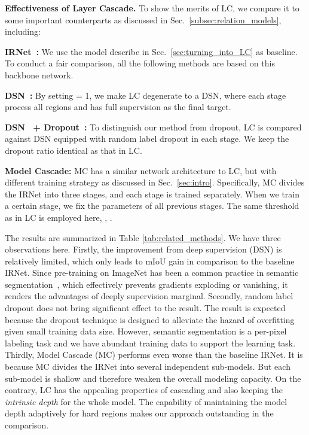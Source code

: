 \documentclass[10pt,twocolumn,letterpaper]{article}
\begin{document}
\vspace{0.1cm}
\noindent
\textbf{Effectiveness of Layer Cascade.}
To show the merits of LC, we compare it to some important counterparts as discussed in Sec.~\ref{subsec:relation_models}, including:
\begin{itemize}
\small{
    \item \textbf{IRNet~\cite{szegedy2016inception}:}
We use the model describe in Sec.~\ref{sec:turning_into_LC} as baseline. 
To conduct a fair comparison, all the following methods are based on this backbone network.
\item \textbf{DSN~\cite{lee2015deeply}:}
By setting  = 1, we make LC degenerate to a DSN, where each stage process all regions and has full supervision as the final target.
\item \textbf{DSN~\cite{lee2015deeply} + Dropout~\cite{srivastava2014dropout}:}
To distinguish our method from dropout, LC is compared against DSN equipped with random label dropout in each stage.
We keep the dropout ratio identical as that in LC.
\item \textbf{Model Cascade:}
MC has a similar network architecture to LC, but with different training strategy as discussed in Sec.~\ref{sec:intro}. 
Specifically, MC divides the IRNet into three stages, and each stage is trained separately.
When we train a certain stage, we fix the parameters of all previous stages.
The same threshold as in LC is employed here, \ie, .  
}
\end{itemize}

The results are summarized in Table \ref{tab:related_methods}. We have three observations here.
Firstly, the improvement from deep supervision (DSN) is relatively limited, which only leads to  mIoU gain in comparison to the baseline IRNet.
Since pre-training on ImageNet has been a common practice in semantic segmentation~\cite{long2014fully}, which effectively prevents gradients exploding or vanishing, it renders the advantages of deeply supervision marginal.
Secondly, random label dropout does not bring significant effect to the result.
The result is expected because the dropout technique is designed to alleviate the hazard of overfitting given small training data size.
However, semantic segmentation is a per-pixel labeling task and we have abundant training data to support the learning task.
Thirdly, Model Cascade (MC) performs even worse than the baseline IRNet.
It is because MC divides the IRNet into several independent sub-models. But each sub-model is shallow and therefore weaken the overall modeling capacity.  
On the contrary, LC has the appealing properties of cascading and also keeping the \textit{intrinsic depth} for the whole model. 
The capability of maintaining the model depth adaptively for hard regions makes our approach outstanding in the comparison.
\end{document}

